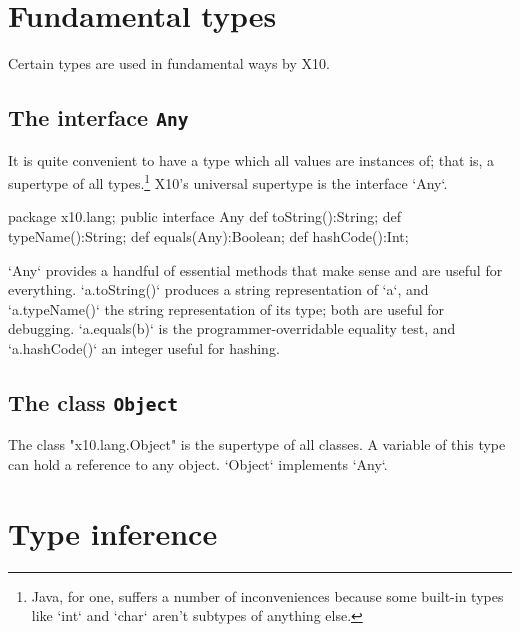 
\section{Fundamental types}

Certain types are used in fundamental ways by X10.  

\subsection{The interface {\tt Any}}

It is quite convenient to have a type which all values are instances of; that
is, a supertype of all types.\footnote{Java, for one, suffers a number of
  inconveniences because some built-in types like \xcd`int` and \xcd`char`
  aren't subtypes of anything else.}  X10's universal supertype is the
  interface \xcd`Any`. 

\begin{xten}
package x10.lang;
public interface Any {
  def toString():String;
  def typeName():String;
  def equals(Any):Boolean;
  def hashCode():Int;
}
\end{xten}

\xcd`Any` provides a handful of essential methods that make sense and are
useful for everything. \xcd`a.toString()` produces a
string representation of \xcd`a`, and \xcd`a.typeName()` the string
representation of its type; both are useful for debugging.  \xcd`a.equals(b)`
is the programmer-overridable equality test, and \xcd`a.hashCode()` an integer
useful for hashing.  


\subsection{The class {\tt Object}}
\label{Object}

The class \xcd"x10.lang.Object" is the supertype of all classes.
A variable of this type can hold a reference to any object.
\xcd`Object` implements \xcd`Any`.



\section{Type inference}
\label{TypeInference}


